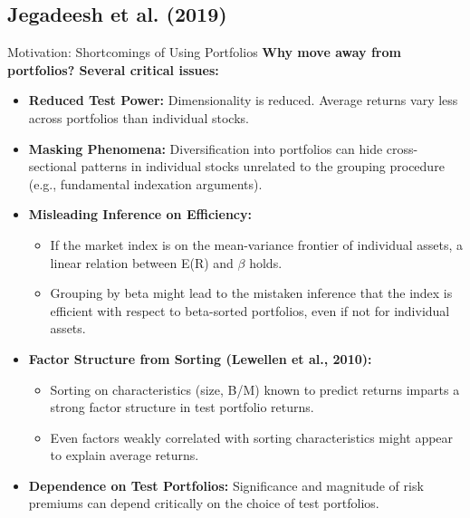 \documentclass[10pt]{beamer}
\begin{document}
\subsection{Jegadeesh et al. (2019)}

\begin{frame}[allowframebreaks]{Motivation: Shortcomings of Using Portfolios}
  \textbf{Why move away from portfolios? Several critical issues:}
  \begin{itemize}
    \item \textbf{Reduced Test Power:} Dimensionality is reduced. Average returns vary less across portfolios than individual stocks.
    \item \textbf{Masking Phenomena:} Diversification into portfolios can hide cross-sectional patterns in individual stocks unrelated to the grouping procedure (e.g., fundamental indexation arguments).
    \item \textbf{Misleading Inference on Efficiency:}
        \begin{itemize}
            \item If the market index is on the mean-variance frontier of individual assets, a linear relation between E(R) and $\beta$ holds.
            \item Grouping by beta might lead to the mistaken inference that the index is efficient with respect to beta-sorted portfolios, even if not for individual assets.
        \end{itemize}
    \item \textbf{Factor Structure from Sorting (Lewellen et al., 2010):}
        \begin{itemize}
            \item Sorting on characteristics (size, B/M) known to predict returns imparts a strong factor structure in test portfolio returns.
            \item Even factors weakly correlated with sorting characteristics might appear to explain average returns.
        \end{itemize}
    \item \textbf{Dependence on Test Portfolios:} Significance and magnitude of risk premiums can depend critically on the choice of test portfolios.
  \end{itemize}
\end{frame}
\end{document}
